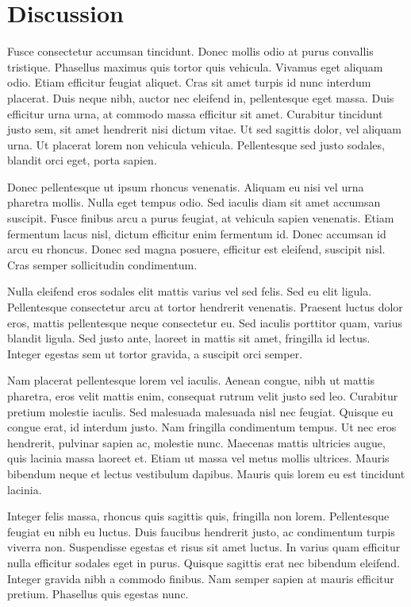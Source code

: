 \documentclass{article}
\begin{document}
\section{Discussion}
Fusce consectetur accumsan tincidunt. Donec mollis odio at purus convallis tristique. Phasellus maximus quis tortor quis vehicula. Vivamus eget aliquam odio. Etiam efficitur feugiat aliquet. Cras sit amet turpis id nunc interdum placerat. Duis neque nibh, auctor nec eleifend in, pellentesque eget massa. Duis efficitur urna urna, at commodo massa efficitur sit amet. Curabitur tincidunt justo sem, sit amet hendrerit nisi dictum vitae. Ut sed sagittis dolor, vel aliquam urna. Ut placerat lorem non vehicula vehicula. Pellentesque sed justo sodales, blandit orci eget, porta sapien.

Donec pellentesque ut ipsum rhoncus venenatis. Aliquam eu nisi vel urna pharetra mollis. Nulla eget tempus odio. Sed iaculis diam sit amet accumsan suscipit. Fusce finibus arcu a purus feugiat, at vehicula sapien venenatis. Etiam fermentum lacus nisl, dictum efficitur enim fermentum id. Donec accumsan id arcu eu rhoncus. Donec sed magna posuere, efficitur est eleifend, suscipit nisl. Cras semper sollicitudin condimentum.

Nulla eleifend eros sodales elit mattis varius vel sed felis. Sed eu elit ligula. Pellentesque consectetur arcu at tortor hendrerit venenatis. Praesent luctus dolor eros, mattis pellentesque neque consectetur eu. Sed iaculis porttitor quam, varius blandit ligula. Sed justo ante, laoreet in mattis sit amet, fringilla id lectus. Integer egestas sem ut tortor gravida, a suscipit orci semper.

Nam placerat pellentesque lorem vel iaculis. Aenean congue, nibh ut mattis pharetra, eros velit mattis enim, consequat rutrum velit justo sed leo. Curabitur pretium molestie iaculis. Sed malesuada malesuada nisl nec feugiat. Quisque eu congue erat, id interdum justo. Nam fringilla condimentum tempus. Ut nec eros hendrerit, pulvinar sapien ac, molestie nunc. Maecenas mattis ultricies augue, quis lacinia massa laoreet et. Etiam ut massa vel metus mollis ultrices. Mauris bibendum neque et lectus vestibulum dapibus. Mauris quis lorem eu est tincidunt lacinia.

Integer felis massa, rhoncus quis sagittis quis, fringilla non lorem. Pellentesque feugiat eu nibh eu luctus. Duis faucibus hendrerit justo, ac condimentum turpis viverra non. Suspendisse egestas et risus sit amet luctus. In varius quam efficitur nulla efficitur sodales eget in purus. Quisque sagittis erat nec bibendum eleifend. Integer gravida nibh a commodo finibus. Nam semper sapien at mauris efficitur pretium. Phasellus quis egestas nunc.
\end{document}
